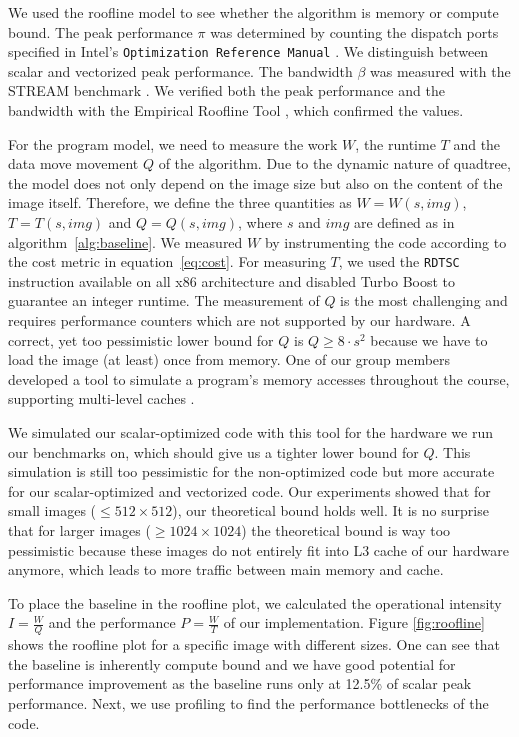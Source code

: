  We used the roofline model \cite{applying-roofline} to see
whether the algorithm is memory or compute bound. The peak performance $\pi$ was
determined by counting the dispatch ports specified in Intel's
\texttt{Optimization Reference Manual} \cite{intel-opt-manual}. We distinguish
between scalar and vectorized peak performance. The bandwidth $\beta$ was
measured with the STREAM benchmark \cite{stream}. We verified both the peak
performance and the bandwidth with the Empirical Roofline Tool \cite{ert}, which
confirmed the values.

For the program model, we need to measure the work $W$, the runtime $T$ and the
data move movement $Q$ of the algorithm. Due to the dynamic nature of quadtree,
the model does not only depend on the image size but also on the content of the
image itself. Therefore, we define the three quantities as $W=W(s, img)$,
$T=T(s, img)$ and $Q=Q(s, img)$, where $s$ and $img$ are defined as in
algorithm~\ref{alg:baseline}. We measured $W$ by instrumenting the code
according to the cost metric in equation~\eqref{eq:cost}. For measuring $T$, we
used the \texttt{RDTSC} instruction available on all x86 architecture and
disabled Turbo Boost to guarantee an integer runtime. The measurement of $Q$ is
the most challenging and requires performance counters which are not supported
by our hardware. A correct, yet too pessimistic lower bound for $Q$ is
$Q \geq 8 \cdot s^2$ because we have to load the image (at least) once from
memory. One of our group members developed a tool to simulate a program's memory
accesses throughout the course, supporting multi-level caches
\cite{github-cache}.

We simulated our scalar-optimized code with this tool for the hardware we run our benchmarks on,
which should give us a tighter lower bound for $Q$.
This simulation is still too pessimistic for the non-optimized code but more accurate for our scalar-optimized and vectorized code.
Our experiments showed that for small images ($\leq 512 \times 512$), our theoretical bound holds well.
It is no surprise that for larger images ($\geq 1024 \times 1024$) the theoretical bound is way too pessimistic
because these images do not entirely fit into L3 cache of our hardware anymore, which leads to more traffic between main memory and cache.

To place the baseline in the roofline plot, we calculated the operational
intensity $I=\frac{W}{Q}$ and the performance $P=\frac{W}{T}$ of our
implementation. Figure \ref{fig:roofline} shows the roofline plot for a specific
image with different sizes. One can see that the baseline is inherently compute
bound and we have good potential for performance improvement as the baseline
runs only at 12.5\% of scalar peak performance. Next, we use profiling to find
the performance bottlenecks of the code.

